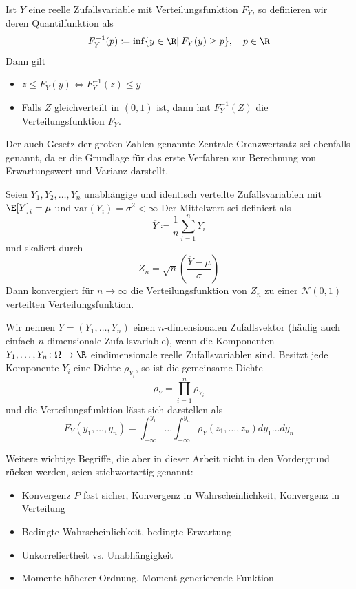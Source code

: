 \begin{maththeorem}[Inversionsmethode]
\label{thinversionsmethode}
Ist $Y$ eine reelle Zufallsvariable mit Verteilungsfunktion $F_Y$, so definieren wir deren Quantilfunktion als
\[F_Y^{-1}(p)\coloneqq \inf\lbrace y\in\R |\: F_Y(y)\ge p\rbrace,\quad p\in\R\]
Dann gilt
\begin{itemize}
\item $z\le F_Y(y)\iff F_Y^{-1}(z)\le y$\\
\item Falls $Z$ gleichverteilt in $(0,1)$ ist, dann hat $F_Y^{-1}(Z)$ die Verteilungsfunktion $F_Y$. 
\end{itemize}
\end{maththeorem}
Der auch Gesetz der großen Zahlen genannte Zentrale Grenzwertsatz sei ebenfalls genannt, da er die Grundlage für das erste Verfahren zur Berechnung von Erwartungswert und Varianz darstellt.
\begin{maththeorem}
\label{thzentralgrenzwert}
Seien $Y_1,Y_2,\dots,Y_n$ unabhängige und identisch verteilte Zufallsvariablen mit $\E[Y]_i=\mu$ und $\text{var}(Y_i)=\sigma^2<\infty$ Der Mittelwert sei definiert als
\[\overline{Y}\coloneqq \frac{1}{n}\sum_{i=1}^nY_i\]
und skaliert durch
\[Z_n=\sqrt{n}\left(\frac{\overline{Y}-\mu}{\sigma}\right)\]
Dann konvergiert für $n\to\infty$ die Verteilungsfunktion von $Z_n$ zu einer $\mathcal{N}(0,1)$ verteilten Verteilungsfunktion.
\end{maththeorem}
\begin{mathdef}[Zufallsvektoren]
Wir nennen $Y=(Y_1,\dots,Y_n)$ einen $n$-dimensionalen Zufallsvektor (häufig auch einfach $n$-dimensionale Zufallsvariable), wenn die Komponenten $Y_1,\dots,Y_n\colon\Omega\to\R$ eindimensionale reelle Zufallsvariablen sind. Besitzt jede Komponente $Y_i$ eine Dichte $\rho_{Y_i}$, so ist die gemeinsame Dichte
\[\rho_Y=\prod_{i=1}^n \rho_{Y_i}\]
und die Verteilungsfunktion lässt sich darstellen als
\[F_Y(y_1,\dots,y_n)=\int_{-\infty}^{y_1}\dots\int_{-\infty}^{y_n}\rho_Y(z_1,\dots,z_n)dy_1\dots dy_n\]
\end{mathdef}
Weitere wichtige Begriffe, die aber in dieser Arbeit nicht in den Vordergrund rücken werden, seien stichwortartig genannt:
\begin{itemize}
\item Konvergenz $P$ fast sicher, Konvergenz in Wahrscheinlichkeit, Konvergenz in Verteilung\\
\item Bedingte Wahrscheinlichkeit, bedingte Erwartung
\item Unkorreliertheit vs. Unabhängigkeit
\item Momente höherer Ordnung, Moment-generierende Funktion
\end{itemize}

